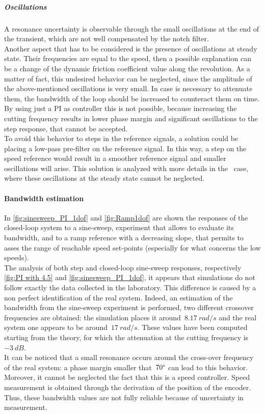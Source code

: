 \subparagraph{Oscillations}
A resonance uncertainty is observable through the small oscillations at the end of the transient, which are not well compensated by the notch filter. \\
Another aspect that has to be considered is the presence of oscillations at steady state. Their frequencies are equal to the speed, then a possible explanation can be a change of the dynamic friction coefficient value along the revolution. As a matter of fact, this undesired behavior can be neglected, since the amplitude of the above-mentioned oscillations is very small. In case is necessary to attenuate them, the bandwidth of the loop should be increased to counteract them on time. By using just a PI as controller this is not possible, because increasing the cutting frequency results in lower phase margin and significant oscillations to the step response, that cannot be accepted. \\
To avoid this behavior to steps in the reference signals, a solution could be placing a low-pass pre-filter on the reference signal. In this way, a step on the speed reference would result in a smoother reference signal and smaller oscillations will arise. This solution is analyzed with more details in the \twodof\ case, where these oscillations at the steady state cannot be neglected.

\paragraph{Bandwidth estimation}
In \cref{fig:sinesweep_PI_1dof} and \cref{fig:Ramp1dof} are shown the responses of the closed-loop system to a sine-sweep, experiment that allows to evaluate its bandwidth, and to a ramp reference with a decreasing slope, that permits to asses the range of reachable speed set-points (especially for what concerns the low speeds). \\
The analysis of both step and closed-loop sine-sweep responses, respectively \cref{fig:PI with 4.5} and \cref{fig:sinesweep_PI_1dof}, it appears that simulations do not follow exactly the data collected in the laboratory. This difference is caused by a non perfect identification of the real system. Indeed, an estimation of the bandwidth from the sine-sweep experiment is performed, two different crossover frequencies are obtained: the simulation places it around~$8.17\ rad/s$ and the real system one appears to be around~$17\ rad/s$. These values have been computed starting from the theory, for which the attenuation at the cutting frequency is~$-3\ dB$. \\
It can be noticed that a small resonance occurs around the cross-over frequency of the real system: a phase margin smaller that~$70 \degree$ can lead to this behavior. \\
Moreover, it cannot be neglected the fact that this is a speed controller. Speed measurement is obtained through the derivation of the position of the encoder. Thus, these bandwidth values are not fully reliable because of uncertainty in measurement.

